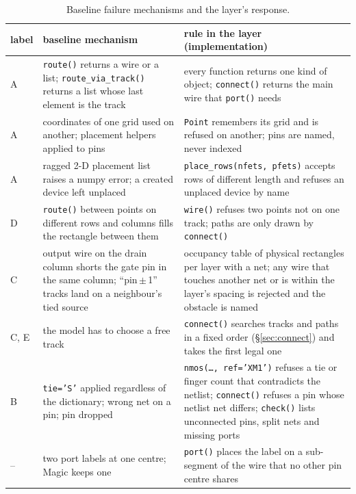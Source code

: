 \documentclass[conference]{IEEEtran}
\newcommand{\code}[1]{\texttt{#1}}
\begin{document}
\begin{table}[t]
\caption{Baseline failure mechanisms and the layer's response.}
\label{tab:layer}
\centering\footnotesize
\begin{tabular}{@{}L{0.08\columnwidth}L{0.34\columnwidth}L{0.49\columnwidth}@{}}
\toprule
label & baseline mechanism & rule in the layer (implementation) \\
\midrule
A & \code{route()} returns a wire or a list; \code{route\_via\_track()} returns a list whose last element is the track & every function returns one kind of object; \code{connect()} returns the main wire that \code{port()} needs \\
A & coordinates of one grid used on another; placement helpers applied to pins & \code{Point} remembers its grid and is refused on another; pins are named, never indexed \\
A & ragged 2-D placement list raises a numpy error; a created device left unplaced & \code{place\_rows(nfets, pfets)} accepts rows of different length and refuses an unplaced device by name \\
D & \code{route()} between points on different rows and columns fills the rectangle between them & \code{wire()} refuses two points not on one track; paths are only drawn by \code{connect()} \\
C & output wire on the drain column shorts the gate pin in the same column; ``pin\,$\pm$\,1'' tracks land on a neighbour's tied source & occupancy table of physical rectangles per layer with a net; any wire that touches another net or is within the layer's spacing is rejected and the obstacle is named \\
C, E & the model has to choose a free track & \code{connect()} searches tracks and paths in a fixed order (\S\ref{sec:connect}) and takes the first legal one \\
B & \code{tie='S'} applied regardless of the dictionary; wrong net on a pin; pin dropped & \code{nmos(\ldots, ref='XM1')} refuses a tie or finger count that contradicts the netlist; \code{connect()} refuses a pin whose netlist net differs; \code{check()} lists unconnected pins, split nets and missing ports \\
-- & two port labels at one centre; Magic keeps one & \code{port()} places the label on a sub-segment of the wire that no other pin centre shares \\
\bottomrule
\end{tabular}
\end{table}
\end{document}
